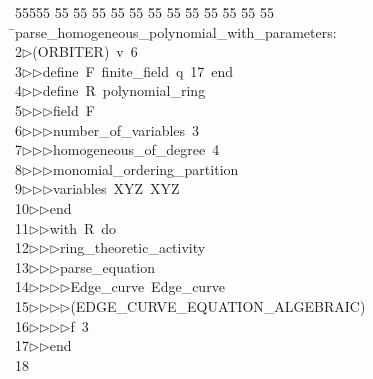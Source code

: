 %
%
\begin{tabbing}
55555 \= 55 \= 55 \= 55 \= 55 \= 55 \= 55 \= 55 \= 55 \= 55 \= 55 \= 55 \= 55 \= \>parse\_homogeneous\_polynomial\_with\_parameters:\\[0pt]
2\>$\triangleright$\>(ORBITER)\ v\ 6\ \\[0pt]
3\>$\triangleright$\>$\triangleright$\>define\ F\ finite\_field\ q\ 17\ end\ \\[0pt]
4\>$\triangleright$\>$\triangleright$\>define\ R\ polynomial\_ring\ \\[0pt]
5\>$\triangleright$\>$\triangleright$\>$\triangleright$\>field\ F\ \\[0pt]
6\>$\triangleright$\>$\triangleright$\>$\triangleright$\>number\_of\_variables\ 3\ \\[0pt]
7\>$\triangleright$\>$\triangleright$\>$\triangleright$\>homogeneous\_of\_degree\ 4\ \\[0pt]
8\>$\triangleright$\>$\triangleright$\>$\triangleright$\>monomial\_ordering\_partition\ \\[0pt]
9\>$\triangleright$\>$\triangleright$\>$\triangleright$\>variables\ XYZ\ XYZ\ \\[0pt]
10\>$\triangleright$\>$\triangleright$\>end\ \\[0pt]
11\>$\triangleright$\>$\triangleright$\>with\ R\ do\ \\[0pt]
12\>$\triangleright$\>$\triangleright$\>$\triangleright$\>ring\_theoretic\_activity\ \\[0pt]
13\>$\triangleright$\>$\triangleright$\>$\triangleright$\>parse\_equation\ \\[0pt]
14\>$\triangleright$\>$\triangleright$\>$\triangleright$\>$\triangleright$\>Edge\_curve\ Edge\_curve\ \\[0pt]
15\>$\triangleright$\>$\triangleright$\>$\triangleright$\>$\triangleright$\>(EDGE\_CURVE\_EQUATION\_ALGEBRAIC)\ \\[0pt]
16\>$\triangleright$\>$\triangleright$\>$\triangleright$\>$\triangleright$\>f\ 3\ \\[0pt]
17\>$\triangleright$\>$\triangleright$\>end\\[0pt]
18\>\end{tabbing}
